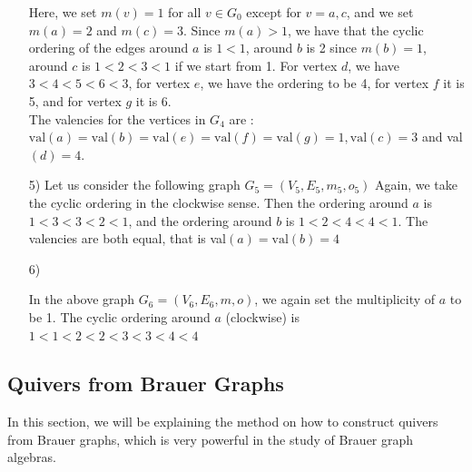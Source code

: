 \documentclass{amsart}
\numberwithin{figure}{section}
\begin{document}
\begin{itemize}
Here, we set $m(v)=1$ for all $v\in G_0$ except for $v=a,c$, and we set $m(a)=2$ and $m(c)=3$. Since $m(a)>1$, we have that the cyclic ordering of the edges around $a$ is $1<1$, around $b$ is 2 since $m(b)=1$, around $c$ is $1<2<3<1$ if we start from 1. For vertex $d$, we have $3<4<5<6<3$, for vertex $e$, we have the ordering to be 4, for vertex $f$ it is 5, and for vertex $g$ it is 6.\\
The valencies for the vertices in $G_4$ are : $\mathrm{val}(a)=\mathrm{val}(b)=\mathrm{val}(e)=\mathrm{val}(f)=\mathrm{val}(g)=1,\mathrm{val}(c)=3$ and val$(d)=4$.
\item[5)] Let us consider the following graph $G_5=(V_5,E_5,m_5,o_5)$
Again, we take the cyclic ordering in the clockwise sense. Then the ordering around $a$ is $1<3<3<2<1$, and the ordering around $b$ is $1<2<4<4<1$. The valencies are both equal, that is val$(a)=\mathrm{val}(b)=4$
\begin{center}

\end{center}
\item[6)] 
\leavevmode
\begin{center}
\end{center}
In the above graph $G_6=(V_6,E_6,m,o)$, we again set the multiplicity of $a$ to be 1. The cyclic ordering around $a$ (clockwise) is $1<1<2<2<3<3<4<4$
\end{itemize}
\subsection{Quivers from Brauer Graphs}
In this section, we will be explaining the method on how to construct quivers from Brauer graphs, which is very powerful in the study of Brauer graph algebras.\\ 
\end{document}
